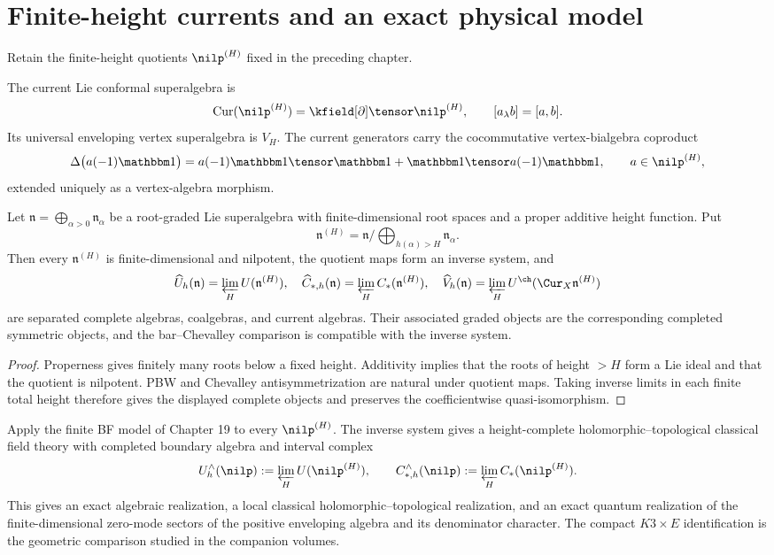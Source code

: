 \chapter{Finite-height currents and an exact physical model}
Retain the finite-height quotients $\nilp^{(H)}$ fixed in the preceding chapter.

The current Lie conformal superalgebra is
\[
 \operatorname{Cur}(\nilp^{(H)})=\kfield[\partial]\tensor\nilp^{(H)},
 \qquad [a_\lambda b]=[a,b].
\]
Its universal enveloping vertex superalgebra is $V_H$. The current generators carry the cocommutative vertex-bialgebra coproduct
\[
 \Delta\bigl(a(-1)\mathbbm1\bigr)
 =a(-1)\mathbbm1\tensor\mathbbm1
 +\mathbbm1\tensor a(-1)\mathbbm1,
 \qquad a\in\nilp^{(H)},
\]
extended uniquely as a vertex-algebra morphism.

\begin{theorem}
Let $\mathfrak n=\bigoplus_{\alpha>0}\mathfrak n_\alpha$ be a root-graded Lie superalgebra with finite-dimensional root spaces and a proper additive height function.  Put
\[
 \mathfrak n^{(H)}=\mathfrak n/\!\bigoplus_{h(\alpha)>H}\mathfrak n_\alpha.
\]
Then every $\mathfrak n^{(H)}$ is finite-dimensional and nilpotent, the quotient maps form an inverse system, and
\[
 \widehat U_h(\mathfrak n)=\varprojlim_HU(\mathfrak n^{(H)}),\quad
 \widehat C_{*,h}(\mathfrak n)=\varprojlim_HC_*(\mathfrak n^{(H)}),\quad
 \widehat V_h(\mathfrak n)=\varprojlim_HU^{\ch}(\Cur_X\mathfrak n^{(H)})
\]
are separated complete algebras, coalgebras, and current algebras.  Their associated graded objects are the corresponding completed symmetric objects, and the bar--Chevalley comparison is compatible with the inverse system.
\end{theorem}
\begin{proof}
Properness gives finitely many roots below a fixed height.  Additivity implies that the roots of height $>H$ form a Lie ideal and that the quotient is nilpotent.  PBW and Chevalley antisymmetrization are natural under quotient maps.  Taking inverse limits in each finite total height therefore gives the displayed complete objects and preserves the coefficientwise quasi-isomorphism.
\end{proof}

Apply the finite BF model of Chapter 19 to every $\nilp^{(H)}$. The inverse system gives a height-complete holomorphic--topological classical field theory with completed boundary algebra and interval complex
\[
 U_h^\wedge(\nilp):=\varprojlim_H U(\nilp^{(H)}),
 \qquad
 C_{*,h}^\wedge(\nilp):=\varprojlim_H C_*(\nilp^{(H)}).
\]
This gives an exact algebraic realization, a local classical holomorphic--topological realization, and an exact quantum realization of the finite-dimensional zero-mode sectors of the positive enveloping algebra and its denominator character. The compact $K3\times E$ identification is the geometric comparison studied in the companion volumes.

